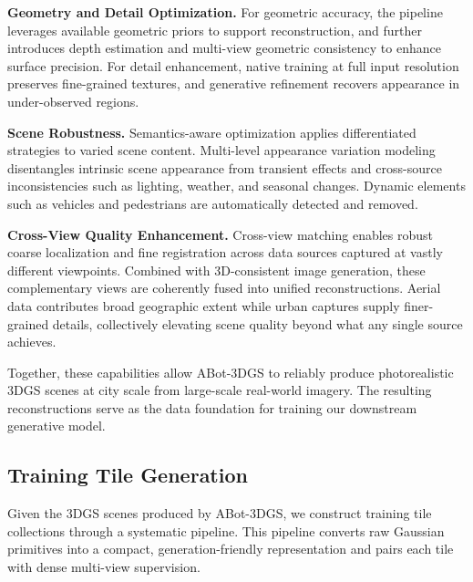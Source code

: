 \documentclass{llmxive}
\providecommand{\paragraph}[1]{\noindent\textbf{#1.}\hspace*{1em}}
\providecommand{\abotgs}{ABot-3DGS\xspace}
\begin{document}
\paragraph{Geometry and Detail Optimization}
For geometric accuracy, the pipeline leverages available geometric priors to support reconstruction, and further introduces depth estimation and multi-view geometric consistency to enhance surface precision. For detail enhancement, native training at full input resolution preserves fine-grained textures, and generative refinement recovers appearance in under-observed regions.

\paragraph{Scene Robustness}
Semantics-aware optimization applies differentiated strategies to varied scene content. Multi-level appearance variation modeling disentangles intrinsic scene appearance from transient effects and cross-source inconsistencies such as lighting, weather, and seasonal changes. Dynamic elements such as vehicles and pedestrians are automatically detected and removed.

\paragraph{Cross-View Quality Enhancement}
Cross-view matching enables robust coarse localization and fine registration across data sources captured at vastly different viewpoints. Combined with 3D-consistent image generation, these complementary views are coherently fused into unified reconstructions. Aerial data contributes broad geographic extent while urban captures supply finer-grained details, collectively elevating scene quality beyond what any single source achieves.

Together, these capabilities allow \abotgs to reliably produce photorealistic 3DGS scenes at city scale from large-scale real-world imagery. The resulting reconstructions serve as the data foundation for training our downstream generative model.

\subsection{Training Tile Generation}
\label{sec:training_data}

Given the 3DGS scenes produced by \abotgs, we construct training tile collections through a systematic pipeline. This pipeline converts raw Gaussian primitives into a compact, generation-friendly representation and pairs each tile with dense multi-view supervision.
\end{document}
